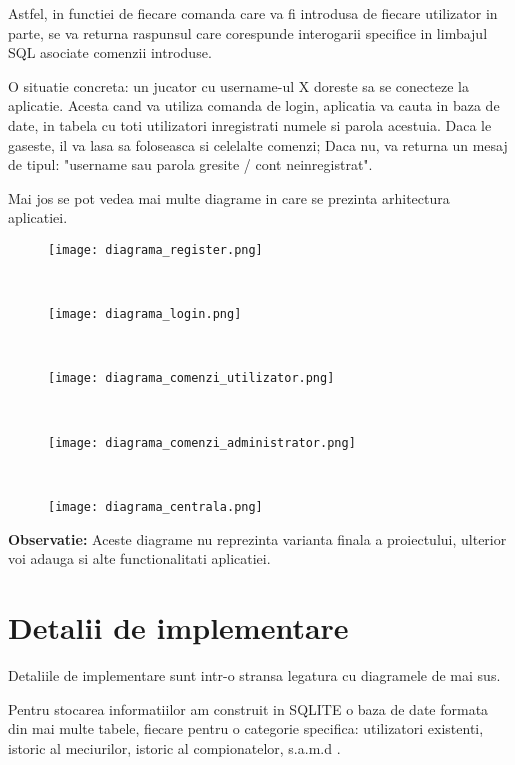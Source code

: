 \documentclass{article}
\begin{document}
Astfel, in functiei de fiecare comanda care va fi introdusa de fiecare utilizator in parte, se va returna raspunsul care corespunde interogarii specifice in limbajul SQL asociate comenzii introduse. 

O situatie concreta: un jucator cu username-ul X doreste sa se conecteze la aplicatie. Acesta cand va utiliza comanda de login, aplicatia va cauta in baza de date, in tabela cu toti utilizatori inregistrati numele si parola acestuia. Daca le gaseste, il va lasa sa foloseasca si celelalte comenzi; Daca nu, va returna un mesaj de tipul: "username sau parola gresite / cont neinregistrat".

Mai jos se pot vedea mai multe diagrame in care se prezinta arhitectura aplicatiei. 

\begin{figure}[h]
\centering
\texttt{[image: diagrama\_register.png]}
\end{figure}
\\
\begin{figure}[h]
\centering
\texttt{[image: diagrama\_login.png]}
\end{figure}
\\
\begin{figure}[h]
\centering
\texttt{[image: diagrama\_comenzi\_utilizator.png]}
\end{figure}
\\
\begin{figure}[h]
\centering
\texttt{[image: diagrama\_comenzi\_administrator.png]}
\end{figure}
\\
\newpage
\begin{figure}[h]
\centering
\texttt{[image: diagrama\_centrala.png]}
\end{figure}

\textbf{Observatie:} Aceste diagrame nu reprezinta varianta finala a proiectului, ulterior voi adauga si alte functionalitati aplicatiei.

\section{Detalii de implementare}
\quad Detaliile de implementare sunt intr-o stransa legatura cu diagramele de mai sus.

Pentru stocarea informatiilor am construit in SQLITE o baza de date formata din mai multe tabele, fiecare pentru o categorie specifica: utilizatori existenti, istoric al meciurilor, istoric al compionatelor, s.a.m.d .
\end{document}
